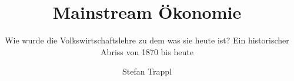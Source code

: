 \documentclass[envcountsame,envcountchap]{svmono}
\begin{document}
\author{Stefan Trappl}
\title{Mainstream Ökonomie}
\subtitle{Wie wurde die Volkswirtschaftslehre zu dem was sie heute ist? Ein historischer Abriss von 1870 bis heute}
\maketitle

\frontmatter%




\tableofcontents


\mainmatter%






















%



\backmatter%

\printbibliography  
\printindex


\end{document}
